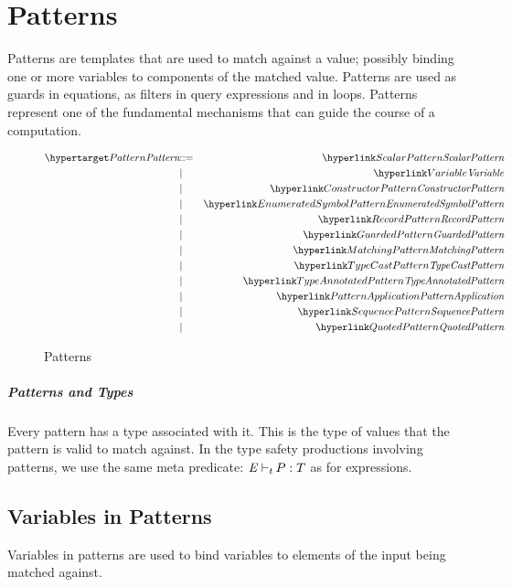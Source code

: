 \chapter{Patterns}
\label{patterns}
Patterns are templates that are used to match against a value; possibly binding one or more variables to components of the matched value. Patterns are used as guards in equations, as filters in query expressions and in  loops. Patterns represent one of the fundamental mechanisms that can guide the course of a computation.

\begin{figure}[htbp]
\begin{eqnarray*}
\ntDef{Pattern}&\arrow&\ntRef{ScalarPattern}\\
&\choice&\ntRef{Variable}\\
&\choice&\ntRef{ConstructorPattern}\\
&\choice&\ntRef{EnumeratedSymbolPattern}\\
&\choice&\ntRef{RecordPattern}\\
&\choice&\ntRef{GuardedPattern}\\
&\choice&\ntRef{MatchingPattern}\\
&\choice&\ntRef{TypeCastPattern}\\
&\choice&\ntRef{TypeAnnotatedPattern}\\
&\choice&\ntRef{PatternApplication}\\
&\choice&\ntRef{SequencePattern}\\
&\choice&\ntRef{QuotedPattern}
\end{eqnarray*}
\caption{Patterns}
\label{patternsFig}
\end{figure}

\paragraph{Patterns and Types}
\label{patternType}
Every pattern has a type associated with it. This is the type of values that the pattern is valid to match against. In the type safety productions involving patterns, we use the same meta predicate: $\emph{E}~\mbox{$\vdash_{t}$}{}\,P:T$ as for expressions.

\section{Variables in Patterns}
\label{patternVariables}
Variables in patterns are used to bind variables to elements of the input being matched against.

